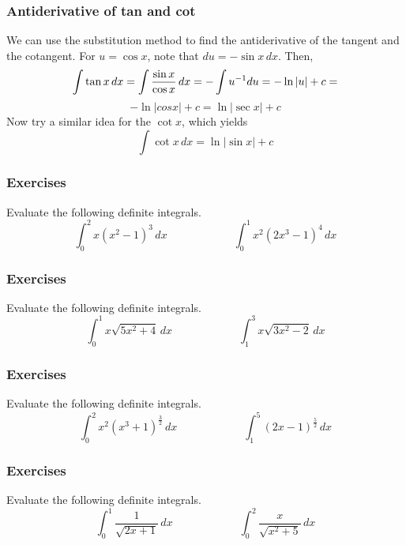 \documentclass[xcolor=dvipsnames]{beamer}
\begin{document}
\begin{frame}
  \frametitle{Antiderivative of tan and cot}
We can use the substitution method to find the antiderivative of the
tangent and the cotangent. For $u=\cos{}x$, note that
$du=-\sin{}x\,dx$. Then,
\begin{equation}
  \label{eq:aibeajuh}
  \int\tan{}x\,dx=\int\frac{\sin{}x}{\cos{}x}\,dx=-\int{}u^{-1}du=-\ln{}|u|+c=\notag
\end{equation}
\begin{equation}
  \label{eq:eeroteda}
-\ln|cos{}x|+c=\ln|\sec{}x|+c
\end{equation}
Now try a similar idea for the $\cot{}x$, which yields
\begin{equation}
  \label{eq:eekahchi}
  \int{}\cot{}x\,dx=\ln|\sin{}x|+c
\end{equation}
\end{frame}


\begin{frame}
  \frametitle{Exercises}
{\ubung} Evaluate the following definite integrals.
\begin{equation}
  \label{eq:mauphouw}
  \int_{0}^{2}x(x^{2}-1)^{3}\,dx\hspace{1in}\int_{0}^{1}x^{2}(2x^{3}-1)^{4}\,dx
\end{equation}
\end{frame}

\begin{frame}
  \frametitle{Exercises}
{\ubung} Evaluate the following definite integrals.
\begin{equation}
  \label{eq:pahteeth}
  \int_{0}^{1}x\sqrt{5x^{2}+4}\,dx\hspace{1in}\int_{1}^{3}x\sqrt{3x^{2}-2}\,dx
\end{equation}
\end{frame}

\begin{frame}
  \frametitle{Exercises}
{\ubung} Evaluate the following definite integrals.
\begin{equation}
  \label{eq:ceiquoor}
  \int_{0}^{2}x^{2}(x^{3}+1)^{\frac{3}{2}}\,dx\hspace{1in}\int_{1}^{5}(2x-1)^{\frac{5}{2}}\,dx
\end{equation}
\end{frame}

\begin{frame}
  \frametitle{Exercises}
{\ubung} Evaluate the following definite integrals.
\begin{equation}
  \label{eq:riweevie}
  \int_{0}^{1}\frac{1}{\sqrt{2x+1}}\,dx\hspace{1in}\int_{0}^{2}\frac{x}{\sqrt{x^{2}+5}}\,dx
\end{equation}
\end{frame}
\end{document}
